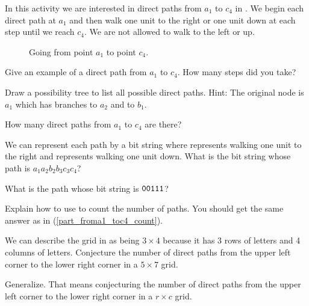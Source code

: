 \begin{act} 
\label{act_froma1_toc4}  
    In this activity we are interested in direct paths from $a_1$ to $c_4$ in . We begin each direct path at $a_1$ and then walk one unit to the right or one unit down at each step until we reach $c_4$. We are not allowed to walk to the left or up.

    \begin{figure}[hbtp]
        \centering
        
        \caption{Going from point $a_1$ to point $c_4$.}
        \label{fig_froma1_toc4}
    \end{figure}

    \begin{actpart}
        \item Give an example of a direct path from $a_1$ to $c_4$.  How many steps did you take?
        \item \label{part_froma1_toc4_tree} Draw a possibility tree to list all possible direct paths. Hint: The original node is $a_1$ which has branches to $a_2$ and to $b_1$.   
        \item \label{part_froma1_toc4_count} How many direct paths from $a_1$ to $c_4$ are there?
        \item We can represent each path by a bit string where  represents walking one unit to the right and  represents walking one unit down.  What is the bit string whose path is $a_1a_2b_2b_3c_3c_4$?
        \item What is the path whose bit string is $\texttt{00111}$?
        \item Explain how to use  to count the number of paths. You should get the same answer as in (\ref{part_froma1_toc4_count}).
        \item We can describe the grid in  as being $3 \times 4$ because it has 3 rows of letters and 4 columns of letters.  Conjecture the number of direct paths from the upper left corner to the lower right corner in a $5 \times 7$ grid.
        \item Generalize. That means conjecturing the number of direct paths from the upper left corner to the lower right corner in a $r \times c$ grid.
    \end{actpart}
\end{act}


\newcommand{\subexplog}{Algebra: Exponential Notation and Logarithms}

